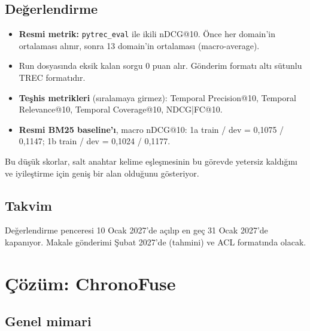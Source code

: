 \documentclass[11pt,a4paper]{article}
\begin{document}
\subsection{Değerlendirme}
\begin{itemize}
  \item \textbf{Resmi metrik:} \texttt{pytrec\_eval} ile ikili nDCG@10. Önce her domain'in
        ortalaması alınır, sonra 13 domain'in ortalaması (macro-average).
  \item Run dosyasında eksik kalan sorgu 0 puan alır. Gönderim formatı altı sütunlu TREC
        formatıdır.
  \item \textbf{Teşhis metrikleri} (sıralamaya girmez): Temporal Precision@10, Temporal
        Relevance@10, Temporal Coverage@10, NDCG|FC@10.
  \item \textbf{Resmi BM25 baseline'ı}, macro nDCG@10:
        1a train / dev = 0,1075 / 0,1147; 1b train / dev = 0,1024 / 0,1177.
\end{itemize}
Bu düşük skorlar, salt anahtar kelime eşleşmesinin bu görevde yetersiz kaldığını ve iyileştirme
için geniş bir alan olduğunu gösteriyor.

\subsection{Takvim}
Değerlendirme penceresi 10 Ocak 2027'de açılıp en geç 31 Ocak 2027'de kapanıyor. Makale
gönderimi Şubat 2027'de (tahmini) ve ACL formatında olacak.

\section{Çözüm: ChronoFuse}
\label{sec:sistem}

\subsection{Genel mimari}
\end{document}
